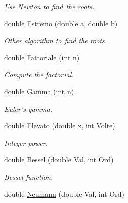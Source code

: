 \begin{DoxyCompactItemize}
\begin{DoxyCompactList}\small\item\em \-Use \-Newton to find the roots. \end{DoxyCompactList}\item 
\hypertarget{classMatematica_a72c0cbce789095808b5c49d3f7f8fee8}{double \hyperlink{classMatematica_a72c0cbce789095808b5c49d3f7f8fee8}{\-Estremo} (double a, double b)}\label{classMatematica_a72c0cbce789095808b5c49d3f7f8fee8}

\begin{DoxyCompactList}\small\item\em \-Other algorithm to find the roots. \end{DoxyCompactList}\item 
\hypertarget{classMatematica_a28deb4e354f861587181caac4a5b9857}{double \hyperlink{classMatematica_a28deb4e354f861587181caac4a5b9857}{\-Fattoriale} (int n)}\label{classMatematica_a28deb4e354f861587181caac4a5b9857}

\begin{DoxyCompactList}\small\item\em \-Compute the factorial. \end{DoxyCompactList}\item 
\hypertarget{classMatematica_a0a9c482dfadf895f3b52888b33121c43}{double \hyperlink{classMatematica_a0a9c482dfadf895f3b52888b33121c43}{\-Gamma} (int n)}\label{classMatematica_a0a9c482dfadf895f3b52888b33121c43}

\begin{DoxyCompactList}\small\item\em \-Euler's gamma. \end{DoxyCompactList}\item 
\hypertarget{classMatematica_a81f44d652f61225a2725c0cb3cbc9524}{double \hyperlink{classMatematica_a81f44d652f61225a2725c0cb3cbc9524}{\-Elevato} (double x, int \-Volte)}\label{classMatematica_a81f44d652f61225a2725c0cb3cbc9524}

\begin{DoxyCompactList}\small\item\em \-Integer power. \end{DoxyCompactList}\item 
\hypertarget{classMatematica_af0a86b99b1cdbff64505cdef059e6d15}{double \hyperlink{classMatematica_af0a86b99b1cdbff64505cdef059e6d15}{\-Bessel} (double \-Val, int \-Ord)}\label{classMatematica_af0a86b99b1cdbff64505cdef059e6d15}

\begin{DoxyCompactList}\small\item\em \-Bessel function. \end{DoxyCompactList}\item 
\hypertarget{classMatematica_a9dce8aab3f083e3071a47fa4d2b1b582}{double \hyperlink{classMatematica_a9dce8aab3f083e3071a47fa4d2b1b582}{\-Neumann} (double \-Val, int \-Ord)}\label{classMatematica_a9dce8aab3f083e3071a47fa4d2b1b582}


\end{DoxyCompactItemize}
